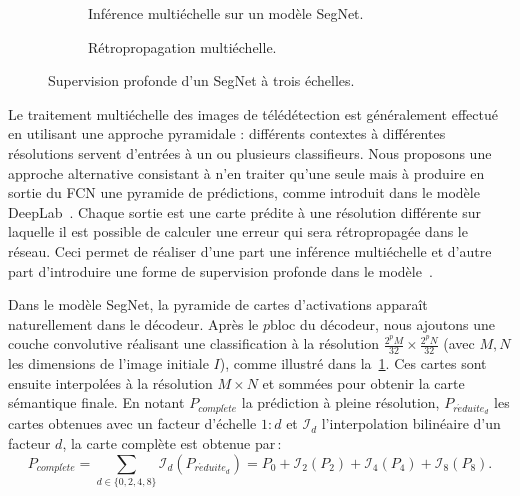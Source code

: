 \begin{figure}[ht]
	  \begin{subfigure}[t]{0.50\textwidth}
		\resizebox{\textwidth}{!}{}
        \caption{Inférence multiéchelle sur un modèle SegNet.}
    \end{subfigure}
    \begin{subfigure}[t]{0.50\textwidth}
		\resizebox{\textwidth}{!}{}
        \caption{Rétropropagation multiéchelle.}
    \end{subfigure}
    \caption{Supervision profonde d'un SegNet à trois échelles.}
    \label{fig:ms_deep_segnet}
\end{figure}

Le traitement multiéchelle des images de télédétection est généralement effectué en utilisant une approche pyramidale : différents contextes à différentes résolutions servent d'entrées à un ou plusieurs classifieurs. Nous proposons une approche alternative consistant à n'en traiter qu'une seule mais à produire en sortie du \gls{FCN} une pyramide de prédictions, comme introduit dans le modèle DeepLab~\cite{chen_deeplab_2018}. Chaque sortie est une carte prédite à une résolution différente sur laquelle il est possible de calculer une erreur qui sera rétropropagée dans le réseau. Ceci permet de réaliser d'une part une inférence multiéchelle et d'autre part d'introduire une forme de supervision profonde dans le modèle~\cite{lee_deeply-supervised_2015}.

Dans le modèle SegNet, la pyramide de cartes d'activations apparaît naturellement dans le décodeur. Après le $p$\ieme bloc du décodeur, nous ajoutons une couche convolutive réalisant une classification à la résolution $\frac{2^p M}{32} \times \frac{2^p N}{32}$ (avec $M, N$ les dimensions de l'image initiale $I$), comme illustré dans la~\cref{fig:ms_deep_segnet}. Ces cartes sont ensuite interpolées à la résolution $M\times N$ et sommées pour obtenir la carte sémantique finale. En notant $P_{\mathit{compl\grave{e}te}}$ la prédiction à pleine résolution, $P_{\mathit{r\acute{e}duite}_d}$ les cartes obtenues avec un facteur d'échelle $1:d$ et $\mathcal{I}_d$ l'interpolation bilinéaire d'un facteur $d$, la carte complète est obtenue par\,:
\begin{equation}
P_{\mathit{compl\grave{e}te}} = \sum_{d \in \{0, 2, 4, 8\}} \mathcal{I}_d(P_{\mathit{r\acute{e}duite}_d}) = P_0 + \mathcal{I}_2(P_2) + \mathcal{I}_4(P_4) + \mathcal{I}_8(P_8).
\end{equation}

